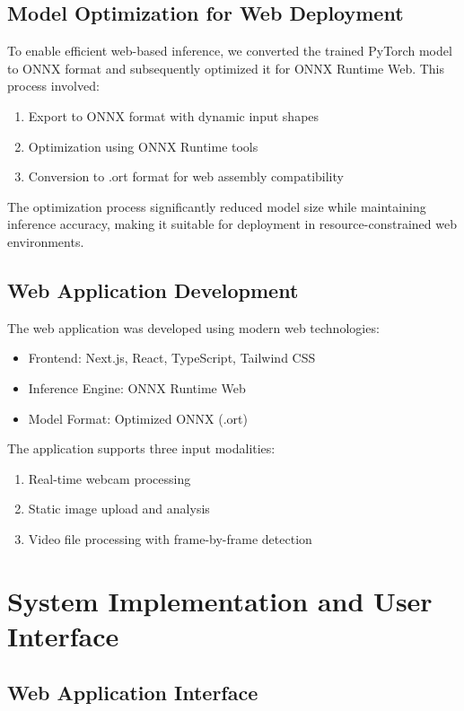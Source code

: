 \documentclass[conference]{IEEEtran}
\begin{document}
\subsection{Model Optimization for Web Deployment}

To enable efficient web-based inference, we converted the trained PyTorch model to ONNX format and subsequently optimized it for ONNX Runtime Web. This process involved:

\begin{enumerate}
\item Export to ONNX format with dynamic input shapes
\item Optimization using ONNX Runtime tools
\item Conversion to .ort format for web assembly compatibility
\end{enumerate}

The optimization process significantly reduced model size while maintaining inference accuracy, making it suitable for deployment in resource-constrained web environments.

\subsection{Web Application Development}

The web application was developed using modern web technologies:
\begin{itemize}
\item Frontend: Next.js, React, TypeScript, Tailwind CSS
\item Inference Engine: ONNX Runtime Web
\item Model Format: Optimized ONNX (.ort)
\end{itemize}

The application supports three input modalities:
\begin{enumerate}
\item Real-time webcam processing
\item Static image upload and analysis
\item Video file processing with frame-by-frame detection
\end{enumerate}

\section{System Implementation and User Interface}

\subsection{Web Application Interface}
\end{document}
